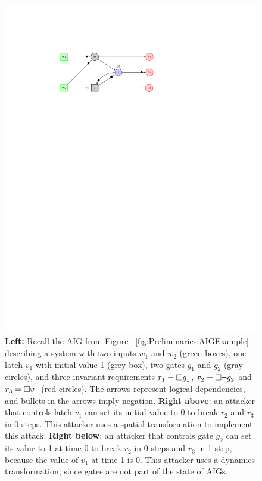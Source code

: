 {\begin{figure}[!t]
\begin{minipage}{0.35\textwidth}
\begin{framed}
\includegraphics[width=\textwidth]{Attack1.pdf}
\end{framed}
\end{minipage}
\caption{\textbf{Left:} Recall the AIG from Figure ~\ref{fig:Preliminaries:AIGExample} describing a system with two
inputs $w_1$ and $w_2$ (green boxes), one latch $v_1$ with initial value 1 (grey box), two gates $g_1$ and $g_2$ (gray circles), and three invariant requirements $r_1={{\square}} g_1$, $r_2={{\square}} \lnot g_2$ and $r_3={{\square}} v_1$ (red circles). 
The arrows represent logical dependencies, and bullets in the arrows imply negation.
\textbf{Right above}: an attacker that controls latch $v_1$ can set its initial value to 0 to break $r_2$ and $r_3$ in 0 steps. This attacker uses a spatial transformation to implement this attack.
\textbf{Right below}: an attacker that controls gate $g_2$ can set its value to 1 at time 0 to break $r_2$ in 0 steps and $r_3$ in 1 step, because the value of $v_1$ at time 1 is 0. This attacker uses a dynamics transformation, since gates are not part of the state of AIGs.}%
\label{fig:Classification:Example}
\end{figure}

}

